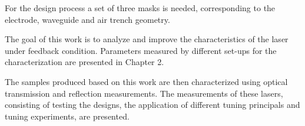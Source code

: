 
For the design process a set of three masks is needed, corresponding to the electrode, waveguide and air trench geometry.

The goal of this work is to analyze and improve the characteristics of the laser under feedback condition. Parameters measured by different set-ups for the characterization are presented in Chapter 2. 

The samples produced based on this work are then characterized using optical transmission and reflection measurements. The measurements of these lasers, consisting of testing the designs, the application of different tuning principals and tuning experiments, are presented.
